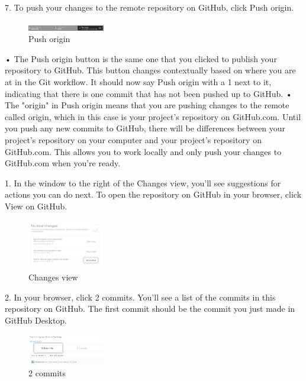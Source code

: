 7.	To push your changes to the remote repository on GitHub, click Push origin.

\begin{figure}[ht]
    \centering
    \includegraphics[width=0.3\textwidth]{figures/Push origin.png}
    \caption{Push origin}
\end{figure}


•	The Push origin button is the same one that you clicked to publish your repository to GitHub. This button changes contextually based on where you are at in the Git workflow. It should now say Push origin with a 1 next to it, indicating that there is one commit that has not been pushed up to GitHub.
•	The "origin" in Push origin means that you are pushing changes to the remote called origin, which in this case is your project's repository on GitHub.com. Until you push any new commits to GitHub, there will be differences between your project's repository on your computer and your project's repository on GitHub.com. This allows you to work locally and only push your changes to GitHub.com when you're ready.

1.	In the window to the right of the Changes view, you'll see suggestions for actions you can do next. To open the repository on GitHub in your browser, click View on GitHub.
\begin{figure}[ht]
    \centering
    \includegraphics[width=0.3\textwidth]{figures/Changes view.png}
    \caption{Changes view}
\end{figure}
 
2.	In your browser, click 2 commits. You'll see a list of the commits in this repository on GitHub. The first commit should be the commit you just made in GitHub Desktop.
\begin{figure}[ht]
    \centering
    \includegraphics[width=0.3\textwidth]{figures/2 commits.png}
    \caption{2 commits}
\end{figure}

